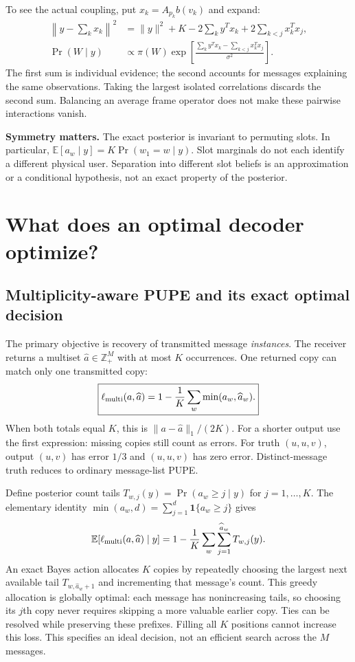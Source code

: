 \documentclass[10pt,a4paper]{article}
\newcommand{\E}{\mathbb E}
\newcommand{\ind}{\mathbf 1}
\begin{document}
To see the actual coupling, put $x_k=A_{p_k}b(v_k)$ and expand:
\begin{align}
 \left\|y-\sum_kx_k\right\|^2
 &=\|y\|^2+K-2\sum_k y^Tx_k+2\sum_{k<j}x_k^Tx_j,\\
 \Pr(W\mid y)&\propto\pi(W)
   \exp\!\left[\frac{\sum_k y^Tx_k-\sum_{k<j}x_k^Tx_j}{\sigma^2}\right].
 \label{eq:interactions}
\end{align}
The first sum is individual evidence; the second accounts for messages explaining the same observations.
Taking the largest isolated correlations discards the second sum. Balancing an average frame operator does not
make these pairwise interactions vanish.

\textbf{Symmetry matters.} The exact posterior is invariant to permuting slots. In particular,
$\E[a_w\mid y]=K\Pr(w_1=w\mid y)$. Slot marginals do not each identify a different physical user. Separation into
different slot beliefs is an approximation or a conditional hypothesis, not an exact property of the posterior.

\clearpage
\section{What does an optimal decoder optimize?}
\subsection{Multiplicity-aware PUPE and its exact optimal decision}
The primary objective is recovery of transmitted message \emph{instances}. The receiver returns a multiset
$\widehat a\in\mathbb Z_+^M$ with at most $K$ occurrences. One returned copy can match only one transmitted copy:
\begin{equation}
 \boxed{\ell_{\rm multi}(a,\widehat a)
 =1-\frac1K\sum_w\min(a_w,\widehat a_w).}
 \label{eq:loss}
\end{equation}
When both totals equal $K$, this is $\|a-\widehat a\|_1/(2K)$. For a shorter output use the first expression:
missing copies still count as errors. For truth $(u,u,v)$, output $(u,v)$ has error $1/3$ and $(u,u,v)$ has zero
error. Distinct-message truth reduces to ordinary message-list PUPE.

Define posterior count tails $T_{w,j}(y)=\Pr(a_w\geq j\mid y)$ for $j=1,\ldots,K$. The elementary identity
$\min(a_w,d)=\sum_{j=1}^d\ind\{a_w\geq j\}$ gives
\begin{equation}
 \E[\ell_{\rm multi}(a,\widehat a)\mid y]
 =1-\frac1K\sum_w\sum_{j=1}^{\widehat a_w}T_{w,j}(y).
 \label{eq:bayes}
\end{equation}
An exact Bayes action allocates $K$ copies by repeatedly choosing the largest next available tail
$T_{w,\widehat a_w+1}$ and incrementing that message's count. This greedy allocation is globally optimal:
each message has nonincreasing tails, so choosing its $j$th copy never requires skipping a more valuable
earlier copy. Ties can be resolved while preserving these prefixes. Filling all $K$ positions cannot increase
this loss. This specifies an ideal decision, not an efficient search across the $M$ messages.
\end{document}
